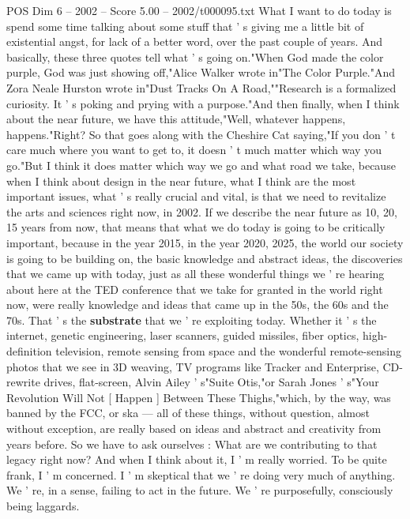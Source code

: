 \begin{textsample}{POS Dim 6 – 2002 – Score 5.00 – 2002/t000095.txt}  \label{ex:f6_pos_005}
What I want to do today is spend some time talking about some stuff that ' s giving me a little bit of existential angst, for lack of a better word, over the past couple of years.
And basically, these three quotes tell what ' s going on."When God made the color purple, God was just showing off,"Alice Walker wrote in"The Color Purple."And Zora Neale Hurston wrote in"Dust Tracks On A Road,""Research is a formalized curiosity.
It ' s poking and prying with a purpose."And then finally, when I think about the near future, we have this attitude,"Well, whatever happens, happens."Right?
So that goes along with the Cheshire Cat saying,"If you don ' t care much where you want to get to, it doesn ' t much matter which way you go."But I think it does matter which way we go and what road we take, because when I think about design in the near future, what I think are the most important issues, what ' s really crucial and vital, is that we need to revitalize the arts and sciences right now, in 2002.
If we describe the near future as 10, 20, 15 years from now, that means that what we do today is going to be critically important, because in the year 2015, in the year 2020, 2025, the world our society is going to be building on, the basic knowledge and abstract ideas, the discoveries that we came up with today, just as all these wonderful things we ' re hearing about here at the TED conference that we take for granted in the world right now, were really knowledge and ideas that came up in the 50s, the 60s and the 70s.
That ' s the \textbf{substrate} that we ' re exploiting today.
Whether it ' s the internet, genetic engineering, laser scanners, guided missiles, fiber optics, high-definition television, remote sensing from space and the wonderful remote-sensing photos that we see in 3D weaving, TV programs like Tracker and Enterprise, CD-rewrite drives, flat-screen, Alvin Ailey ' s"Suite Otis,"or Sarah Jones ' s"Your Revolution Will Not [ Happen ] Between These Thighs,"which, by the way, was banned by the FCC, or ska — all of these things, without question, almost without exception, are really based on ideas and abstract and creativity from years before.
So we have to ask ourselves : What are we contributing to that legacy right now?
And when I think about it, I ' m really worried.
To be quite frank, I ' m concerned.
I ' m skeptical that we ' re doing very much of anything.
We ' re, in a sense, failing to act in the future.
We ' re purposefully, consciously being laggards.

\end{textsample}
